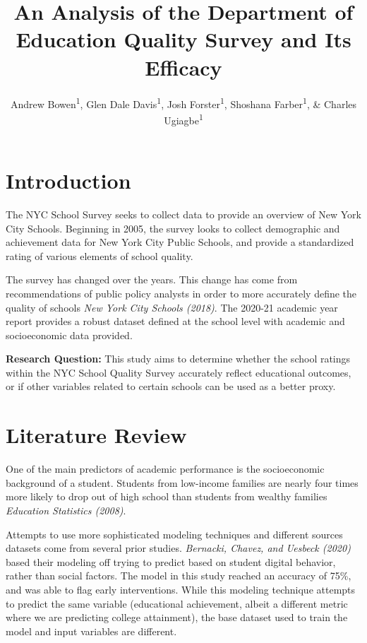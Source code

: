 \documentclass[
  man]{apa6}
\title{An Analysis of the Department of Education Quality Survey and Its Efficacy}
\author{Andrew Bowen\textsuperscript{1}, Glen Dale Davis\textsuperscript{1}, Josh Forster\textsuperscript{1}, Shoshana Farber\textsuperscript{1}, \& Charles Ugiagbe\textsuperscript{1}}
\date{}
\affiliation{\vspace{0.5cm}\textsuperscript{1} City University of New York}
\begin{document}
\maketitle

\hypertarget{introduction}{%
\section{Introduction}\label{introduction}}

The NYC School Survey seeks to collect data to provide an overview of New York City Schools. Beginning in 2005, the survey looks to collect demographic and achievement data for New York City Public Schools, and provide a standardized rating of various elements of school quality.

The survey has changed over the years. This change has come from recommendations of public policy analysts in order to more accurately define the quality of schools \emph{New York City Schools (2018)}. The 2020-21 academic year report provides a robust dataset defined at the school level with academic and socioeconomic data provided.

\textbf{Research Question:} This study aims to determine whether the school ratings within the NYC School Quality Survey accurately reflect educational outcomes, or if other variables related to certain schools can be used as a better proxy.

\hypertarget{literature-review}{%
\section{Literature Review}\label{literature-review}}

One of the main predictors of academic performance is the socioeconomic background of a student. Students from low-income families are nearly four times more likely to drop out of high school than students from wealthy families \emph{Education Statistics (2008)}.

Attempts to use more sophisticated modeling techniques and different sources datasets come from several prior studies. \emph{Bernacki, Chavez, and Uesbeck (2020)} based their modeling off trying to predict based on student digital behavior, rather than social factors. The model in this study reached an accuracy of 75\%, and was able to flag early interventions. While this modeling technique attempts to predict the same variable (educational achievement, albeit a different metric where we are predicting college attainment), the base dataset used to train the model and input variables are different.
\end{document}
